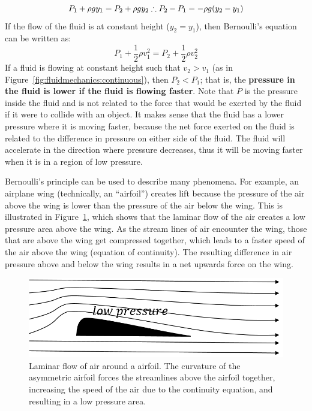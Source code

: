 \begin{equation}
P_1 + \rho g y_1= P_2 + \rho g y_2\\
\therefore P_2 - P_1 = - \rho g (y_2 - y_1)
\end{equation}
If the flow of the fluid is at constant height ($y_2=y_1$), then Bernoulli's equation can be written as:
\begin{equation}
P_1 +\frac{1}{2}\rho v_1^2 = P_2 + \frac{1}{2}\rho v_2^2
\end{equation}
If a fluid is flowing at constant height such that $v_2 > v_1$ (as in Figure~\ref{fig:fluidmechanics:continuous}), then $P_2<P_1$; that is, the \textbf{pressure in the fluid is lower if the fluid is flowing faster}. Note that $P$ is the pressure inside the fluid and is not related to the force that would be exerted by the fluid if it were to collide with an object. It makes sense that the fluid has a lower pressure where it is moving faster, because the net force exerted on the fluid is related to the difference in pressure on either side of the fluid. The fluid will accelerate in the direction where pressure decreases, thus it will be moving faster when it is in a region of low pressure.

Bernoulli's principle can be used to describe many phenomena. For example, an airplane wing (technically, an ``airfoil'') creates lift because the pressure of the air above the wing is lower than the pressure of the air below the wing. This is illustrated in Figure~\ref{fig:fluidmechanics:airfoil}, which shows that the laminar flow of the air creates a low pressure area above the wing. As the stream lines of air encounter the wing, those that are above the wing get compressed together, which leads to a faster speed of the air above the wing (equation of continuity). The resulting difference in air pressure above and below the wing results in a net upwards force on the wing.

\begin{figure}[!htbp]
\centering
\includegraphics[width=0.5\linewidth]{files/airfoil-d539a074e9b004c12ca6bf5772a0b8bd.png}
\caption[]{Laminar flow of air around a airfoil. The curvature of the asymmetric airfoil forces the streamlines above the airfoil together, increasing the speed of the air due to the continuity equation, and resulting in a low pressure area.}
\label{fig:fluidmechanics:airfoil}
\end{figure}

